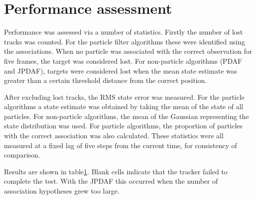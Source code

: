 \section{Performance assessment}
Performance was assessed via a number of statistics. Firstly the number of lost tracks was counted. For the particle filter algorithms these were identified using the associations. When no particle was associated with the correct observation for five frames, the target was considered lost. For non-particle algorithms (PDAF and JPDAF), targets were considered lost when the mean state estimate was greater than a certain threshold distance from the correct position.

After excluding lost tracks, the RMS state error was measured. For the particle algorithms a state estimate was obtained by taking the mean of the state of all particles. For non-particle algorithms, the mean of the Gaussian representing the state distribution was used. For particle algorithms, the proportion of particles with the correct association was also calculated. These statistics were all measured at a fixed lag of five steps from the current time, for consistency of comparison.

Results are shown in table\ref{}. Blank cells indicate that the tracker failed to complete the test. With the JPDAF this occurred when the number of association hypotheses grew too large.


